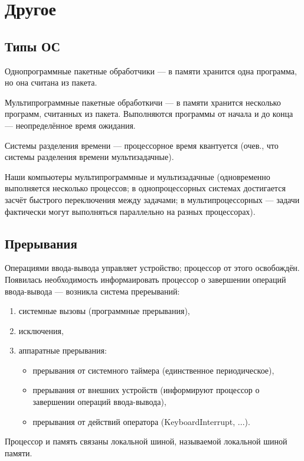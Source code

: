 \section{Другое}

\subsection{Типы ОС}

Однопрограммные пакетные обработчики --- в памяти хранится одна программа, но она считана из пакета.

Мультипрограммные пакетные обработкичи --- в памяти хранится несколько программ, считанных из пакета. Выполняются программы от начала и до конца --- неопределённое время ожидания.

Системы разделения времени --- процессорное время квантуется (очев., что системы разделения времени мультизадачные).

Наши компьютеры мультипрограммные и мультизадачные (одновременно выполняется несколько процессов; в однопроцессорных системах достигается засчёт быстрого переключения между задачами; в мультипроцессорных --- задачи фактически могут выполняться параллельно на разных процессорах).

\subsection{Прерывания}

Операциями ввода-вывода управляет устройство; процессор от этого освобождён.
Появилась необходимость информаировать процессор о завершении операций ввода-вывода --- возникла система пререываний:
\begin{enumerate}
    \item системные вызовы (программные прерывания),
    \item исключения,
    \item аппаратные прерывания:
    \begin{itemize}
        \item прерывания от системного таймера (единственное периодическое),
        \item прерывания от внешних устройств (информируют процессор о завершении операций ввода-вывода),
        \item прерывания от действий оператора (KeyboardInterrupt, ...).
    \end{itemize}
\end{enumerate}

Процессор и память связаны локальной шиной, называемой локальной шиной памяти.

